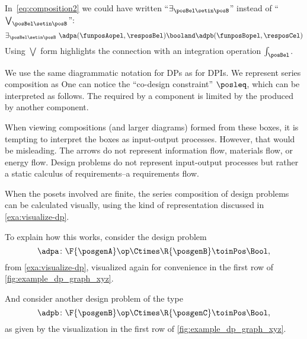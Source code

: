 In~\cref{eq:composition2} we could have written ``$\exists_{\posBel\setin \posB}$'' instead of ``$\bigvee_{\posBel\setin \posB}$'':
\begin{equation}
    \exists_{\posBel \setin \posB}\  \adpa(\funposAopel,\resposBel) \booland \adpb(\funposBopel,\resposCel)
\end{equation}
Using $\bigvee$ form highlights the connection with an integration operation $\int_\posBel$.

We use the same diagrammatic notation for DPs as for DPIs.
We represent series composition as
%
%
One can notice the ``co-design constraint'' $\posleq$, which can be interpreted as follows.
The  required by a component is limited by the  produced by another component.

When viewing compositions (and larger diagrams) formed from these boxes, it is tempting to interpret the boxes as input-output processes.
However, that would be misleading.
The arrows do not represent information flow, materials flow, or energy flow.
Design problems do not represent input-output processes but rather a static calculus of requirements--a requirements flow.

When the posets involved are finite, the series composition of design problems can be calculated visually, using the kind of representation discussed in \cref{exa:visualize-dp}.

To explain how this works, consider the design problem
\begin{equation}
    \adpa \colon \F{\posgenA} \op \Ctimes  \R{\posgenB} \toinPos \Bool,
\end{equation}
from \cref{exa:visualize-dp}, visualized again for convenience in the first row of \cref{fig:example_dp_graph_xyz}.

And consider another design problem of the type
\begin{equation}
    \adpb \colon \F{\posgenB} \op \Ctimes  \R{\posgenC} \toinPos \Bool,
\end{equation}
as given by the visualization in the first row of \cref{fig:example_dp_graph_xyz}.

